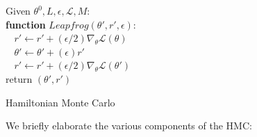 \documentclass[a4paper,11pt]{article}
\theoremstyle{mytheor}
\begin{document}
	\begin{algorithm}[H]
		\SetAlgoLined
		Given $\theta^0, L, \epsilon, \mathcal{L}, M$:\\
		\textbf{function} $Leapfrog(\theta', r', \epsilon):$\\
		    $~~~~r' \gets r' + (\epsilon / 2) \nabla_\theta \mathcal{L}(\theta)$\\
		    $~~~~\theta' \gets \theta' +  (\epsilon ) r'$\\
	        $~~~~r' \gets r' + (\epsilon / 2) \nabla_\theta \mathcal{L}(\theta')$\\
		return $(\theta', r')$
		\caption{Hamiltonian Monte Carlo}
	\end{algorithm}
	\vspace{0.5cm}
	We briefly elaborate the various components of the HMC:
\end{document}
